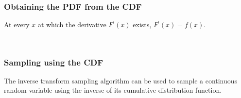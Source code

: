 \documentclass[10pt]{beamer}
\begin{document}
\begin{frame}
\frametitle{Obtaining the PDF from the CDF}

At every $x$ at which the derivative $F^\prime(x)$ exists, $F^\prime(x) = f(x)$.

\

\end{frame}

\begin{frame}
\frametitle{Sampling using the CDF}

The inverse transform sampling algorithm can be used to sample a continuous random variable
using the inverse of its cumulative distribution function.

\


\ 


\end{frame}
\end{document}
